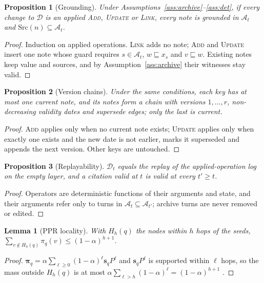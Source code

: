 \documentclass[10pt]{article}
\theoremstyle{plain}
\newtheorem{proposition}{Proposition}
\newtheorem{lemma}{Lemma}
\theoremstyle{definition}
\newcommand{\sub}{\sqsubseteq}
\newcommand{\A}{\mathcal{A}}
\newcommand{\D}{\mathcal{D}}
\begin{document}
\begin{proposition}[Grounding]\label{prop:grounding}
Under Assumptions~\ref{ass:archive}--\ref{ass:det}, if every change to $\D$ is an applied \textsc{Add},
\textsc{Update} or \textsc{Link}, every note is grounded in $\A_t$ and $\mathrm{Src}(n)\subseteq\A_t$.
\end{proposition}
\begin{proof}
Induction on applied operations. \textsc{Link} adds no note; \textsc{Add} and \textsc{Update} insert one
note whose guard requires $s\in\A_t$, $w\sub x_s$ and $v\sub w$. Existing notes keep value and sources,
and by Assumption~\ref{ass:archive} their witnesses stay valid.
\end{proof}

\begin{proposition}[Version chains]\label{prop:chain}
Under the same conditions, each key has at most one current note, and its notes form a chain with versions
$1,\dots,r$, non-decreasing validity dates and \textsf{supersede} edges; only the last is current.
\end{proposition}
\begin{proof}
\textsc{Add} applies only when no current note exists; \textsc{Update} applies only when exactly one exists
and the new date is not earlier, marks it superseded and appends the next version. Other keys are untouched.
\end{proof}

\begin{proposition}[Replayability]\label{prop:replay}
$\D_t$ equals the replay of the applied-operation log on the empty layer, and a citation valid at $t$ is
valid at every $t'\ge t$.
\end{proposition}
\begin{proof}
Operators are deterministic functions of their arguments and state, and their arguments refer only to
turns in $\A_t\subseteq\A_{t'}$; archive turns are never removed or edited.
\end{proof}

\begin{lemma}[PPR locality]\label{lem:ppr}
With $H_h(q)$ the nodes within $h$ hops of the seeds, $\sum_{v\notin H_h(q)}\pi_q(v)\le(1-\alpha)^{h+1}$.
\end{lemma}
\begin{proof}
$\boldsymbol\pi_q=\alpha\sum_{\ell\ge0}(1-\alpha)^{\ell}\mathbf{s}_qP^{\ell}$ and $\mathbf{s}_qP^{\ell}$ is supported
within $\ell$ hops, so the mass outside $H_h(q)$ is at most $\alpha\sum_{\ell>h}(1-\alpha)^{\ell}=(1-\alpha)^{h+1}$
\citep{andersen2006local}.
\end{proof}
\end{document}
